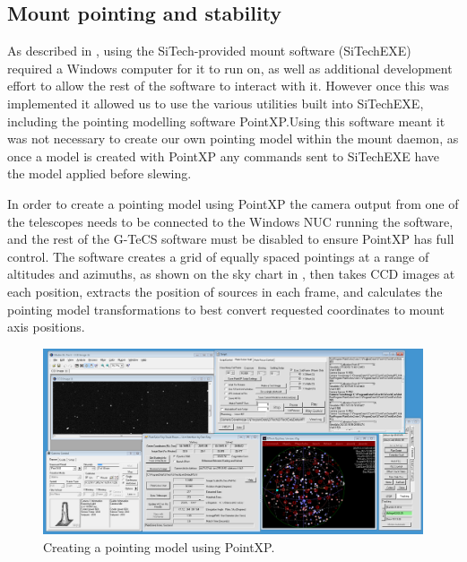 \subsection{Mount pointing and stability}
\label{sec:pointxp}
\begin{colsection}

As described in , using the SiTech-provided mount software (SiTechEXE) required a Windows computer for it to run on, as well as additional development effort to allow the rest of the software to interact with it. However once this was implemented it allowed us to use the various utilities built into SiTechEXE, including the pointing modelling software PointXP.\@ Using this software meant it was not necessary to create our own pointing model within the mount daemon, as once a model is created with PointXP any commands sent to SiTechEXE have the model applied before slewing.

In order to create a pointing model using PointXP the camera output from one of the telescopes needs to be connected to the Windows NUC running the software, and the rest of the G-TeCS software must be disabled to ensure PointXP has full control. The software creates a grid of equally spaced pointings at a range of altitudes and azimuths, as shown on the sky chart in , then takes CCD images at each position, extracts the position of sources in each frame, and calculates the pointing model transformations to best convert requested coordinates to mount axis positions.

\begin{figure}[t]
    \begin{center}
        \includegraphics[width=\linewidth]{images/pointing_model.png}
    \end{center}
    \caption[Creating a pointing model using PointXP]{
        Creating a pointing model using PointXP.\@
    }\label{fig:pointing_model}
\end{figure}


\end{colsection}
